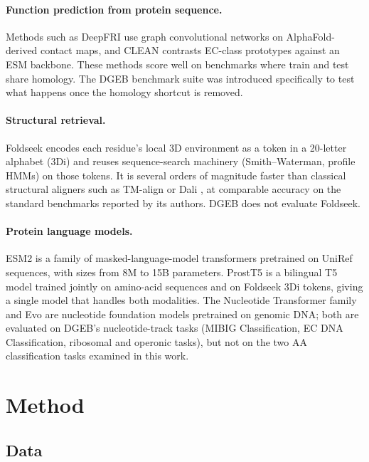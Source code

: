\documentclass[11pt,letterpaper]{article}
\begin{document}
\paragraph{Function prediction from protein sequence.}
Methods such as DeepFRI \citep{gligorijevic2021deepfri} use graph
convolutional networks on AlphaFold-derived contact maps, and CLEAN
\citep{yu2023clean} contrasts EC-class prototypes against an ESM
backbone. These methods score well on benchmarks where train and test
share homology. The DGEB benchmark suite \citep{westroberts2024dgeb} was
introduced specifically to test what happens once the homology
shortcut is removed.

\paragraph{Structural retrieval.}
Foldseek \citep{vankempen2024foldseek} encodes each residue's local
3D environment as a token in a 20-letter alphabet (3Di) and reuses
sequence-search machinery (Smith--Waterman, profile HMMs) on those
tokens. It is several orders of magnitude faster than classical
structural aligners such as TM-align \citep{zhang2005tmalign} or Dali
\citep{holm1993dali}, at comparable accuracy on the standard benchmarks
reported by its authors. DGEB does not evaluate Foldseek.

\paragraph{Protein language models.}
ESM2 \citep{lin2023esm2} is a family of masked-language-model
transformers pretrained on UniRef sequences, with sizes from 8M to 15B
parameters. ProstT5 \citep{heinzinger2024prostt5} is a
bilingual T5 model trained jointly on amino-acid sequences and on
Foldseek 3Di tokens, giving a single model that handles both
modalities. The Nucleotide Transformer family
\citep{dallatorre2024nt} and Evo \citep{nguyen2024evo} are nucleotide
foundation models pretrained on genomic DNA; both are evaluated on
DGEB's nucleotide-track tasks (MIBIG Classification, EC DNA
Classification, ribosomal and operonic tasks), but not on the two AA
classification tasks examined in this work.

\section{Method}

\subsection{Data}
\end{document}
